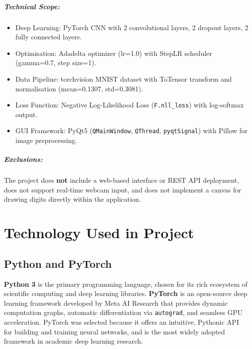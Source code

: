 \documentclass[12pt,a4paper,openany]{report}
\begin{document}
\paragraph{Technical Scope:}
\begin{itemize}
    \item Deep Learning: PyTorch CNN with 2 convolutional layers, 2 dropout layers, 2 fully connected layers.
    \item Optimisation: Adadelta optimizer (lr=1.0) with StepLR scheduler (gamma=0.7, step size=1).
    \item Data Pipeline: torchvision MNIST dataset with ToTensor transform and normalisation (mean=0.1307, std=0.3081).
    \item Loss Function: Negative Log-Likelihood Loss (\texttt{F.nll\_loss}) with log-softmax output.
    \item GUI Framework: PyQt5 (\texttt{QMainWindow}, \texttt{QThread}, \texttt{pyqtSignal}) with Pillow for image preprocessing.
\end{itemize}

\paragraph{Exclusions:}
The project does \textbf{not} include a web-based interface or REST API deployment, does not support real-time webcam input, and does not implement a canvas for drawing digits directly within the application.

\chapter{Technology Used in Project}

\section{Python and PyTorch}

\textbf{Python 3} is the primary programming language, chosen for its rich ecosystem of scientific computing and deep learning libraries. \textbf{PyTorch} is an open-source deep learning framework developed by Meta AI Research that provides dynamic computation graphs, automatic differentiation via \texttt{autograd}, and seamless GPU acceleration. PyTorch was selected because it offers an intuitive, Pythonic API for building and training neural networks, and is the most widely adopted framework in academic deep learning research.
\end{document}
